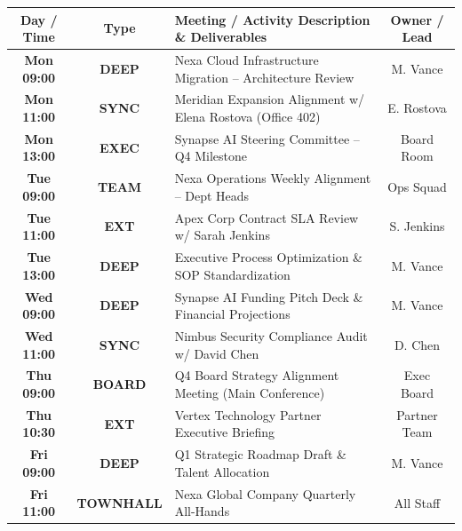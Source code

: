 \documentclass[10pt, landscape]{article}
\begin{document}
\begin{minipage}[t]{0.68\linewidth}
  \begin{tcolorbox}[execbox, title={\faCalendarCheck~ WEEKDAY HOURLY ACTION ITEMS \& MEETING NOTES}]
    \setlength{\extrarowheight}{2pt}
    \begin{tabularx}{\linewidth}{c c X c}
      \hline
      \rowcolor{ExecNavy!10}
      \textbf{Day / Time} & \textbf{Type} & \textbf{Meeting / Activity Description \& Deliverables} & \textbf{Owner / Lead} \\
      \hline
      \textbf{Mon 09:00} & \color{DeepWorkTxt}\textbf{DEEP} & Nexa Cloud Infrastructure Migration -- Architecture Review & M. Vance \\
      \textbf{Mon 11:00} & \color{MeetingTxt}\textbf{SYNC} & Meridian Expansion Alignment w/ Elena Rostova (Office 402) & E. Rostova \\
      \textbf{Mon 13:00} & \color{MeetingTxt}\textbf{EXEC} & Synapse AI Steering Committee -- Q4 Milestone & Board Room \\
      \textbf{Tue 09:00} & \color{MeetingTxt}\textbf{TEAM} & Nexa Operations Weekly Alignment -- Dept Heads & Ops Squad \\
      \textbf{Tue 11:00} & \color{ClientTxt}\textbf{EXT} & Apex Corp Contract SLA Review w/ Sarah Jenkins & S. Jenkins \\
      \textbf{Tue 13:00} & \color{DeepWorkTxt}\textbf{DEEP} & Executive Process Optimization \& SOP Standardization & M. Vance \\
      \textbf{Wed 09:00} & \color{DeepWorkTxt}\textbf{DEEP} & Synapse AI Funding Pitch Deck \& Financial Projections & M. Vance \\
      \textbf{Wed 11:00} & \color{MeetingTxt}\textbf{SYNC} & Nimbus Security Compliance Audit w/ David Chen & D. Chen \\
      \textbf{Thu 09:00} & \color{MeetingTxt}\textbf{BOARD} & Q4 Board Strategy Alignment Meeting (Main Conference) & Exec Board \\
      \textbf{Thu 10:30} & \color{ClientTxt}\textbf{EXT} & Vertex Technology Partner Executive Briefing & Partner Team \\
      \textbf{Fri 09:00} & \color{DeepWorkTxt}\textbf{DEEP} & Q1 Strategic Roadmap Draft \& Talent Allocation & M. Vance \\
      \textbf{Fri 11:00} & \color{MeetingTxt}\textbf{TOWNHALL} & Nexa Global Company Quarterly All-Hands & All Staff \\
      \hline
    \end{tabularx}
  \end{tcolorbox}


\end{minipage}
\end{document}
